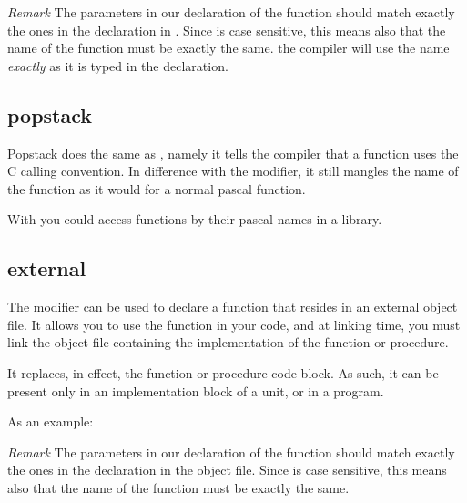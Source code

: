 \documentclass{report}
\begin{document}
{\em Remark} The parameters in our declaration of the  function should 
match exactly the ones in the declaration in . Since  is case 
sensitive, this means also that the name of the
function must be exactly the same. the \fpc compiler will use the name {\em
exactly} as it is typed in the declaration.

\subsection{popstack}
\label{se:popstack}
Popstack does the same as , namely it tells the \fpc compiler
that a function uses the C calling convention. In difference with the
 modifier, it still mangles the name of the function as it would 
for a normal pascal function.

With  you could access functions by their pascal names in a
library.

\subsection{external}
\label{se:external}
The  modifier can be used to declare a function that resides in
an external object file. It allows you to use the function in
your code, and at linking time, you must link the object file containing the
implementation of the function or procedure.

It replaces, in effect, the function or procedure code block. As such, it
can be present only in an implementation block of a unit, or in a program. 

As an example:

{\em Remark} The parameters in our declaration of the  function 
should match exactly the ones in the declaration in the object file.
Since  is case sensitive, this means also that the name of the
function must be exactly the same.
\end{document}
